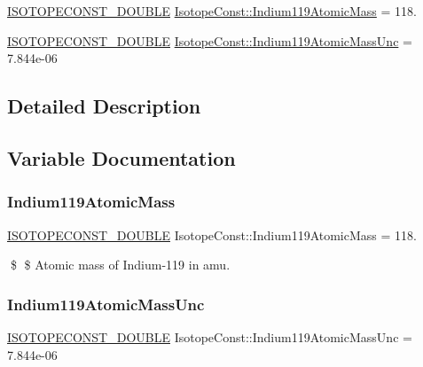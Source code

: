 \begin{DoxyCompactItemize}
\item 
\mbox{\hyperlink{group___isotope_const-_macros_ga8f45a7272ce02c0b4c65c44636ed719a}{I\+S\+O\+T\+O\+P\+E\+C\+O\+N\+S\+T\+\_\+\+D\+O\+U\+B\+LE}} \mbox{\hyperlink{group___isotope_const-_indium-_in119_ga9907729e0cef01ec0c94045b6d40a6a2}{Isotope\+Const\+::\+Indium119\+Atomic\+Mass}} = 118.
\item 
\mbox{\hyperlink{group___isotope_const-_macros_ga8f45a7272ce02c0b4c65c44636ed719a}{I\+S\+O\+T\+O\+P\+E\+C\+O\+N\+S\+T\+\_\+\+D\+O\+U\+B\+LE}} \mbox{\hyperlink{group___isotope_const-_indium-_in119_gab2ba86956bda27639e5452d46377b0d7}{Isotope\+Const\+::\+Indium119\+Atomic\+Mass\+Unc}} = 7.\+844e-\/06
\end{DoxyCompactItemize}


\subsection{Detailed Description}


\subsection{Variable Documentation}
\mbox{\label{group___isotope_const-_indium-_in119_ga9907729e0cef01ec0c94045b6d40a6a2}} 
\subsubsection{\texorpdfstring{Indium119\+Atomic\+Mass}{Indium119AtomicMass}}
{\footnotesize\ttfamily \mbox{\hyperlink{group___isotope_const-_macros_ga8f45a7272ce02c0b4c65c44636ed719a}{I\+S\+O\+T\+O\+P\+E\+C\+O\+N\+S\+T\+\_\+\+D\+O\+U\+B\+LE}} Isotope\+Const\+::\+Indium119\+Atomic\+Mass = 118.}

\$ \$ Atomic mass of Indium-\/119 in amu. \mbox{\label{group___isotope_const-_indium-_in119_gab2ba86956bda27639e5452d46377b0d7}} 
\subsubsection{\texorpdfstring{Indium119\+Atomic\+Mass\+Unc}{Indium119AtomicMassUnc}}
{\footnotesize\ttfamily \mbox{\hyperlink{group___isotope_const-_macros_ga8f45a7272ce02c0b4c65c44636ed719a}{I\+S\+O\+T\+O\+P\+E\+C\+O\+N\+S\+T\+\_\+\+D\+O\+U\+B\+LE}} Isotope\+Const\+::\+Indium119\+Atomic\+Mass\+Unc = 7.\+844e-\/06}

